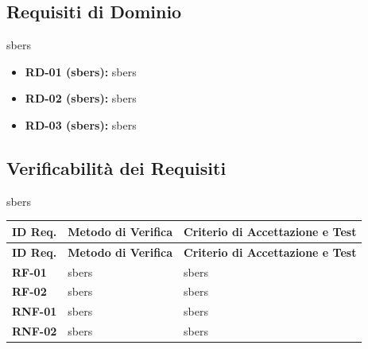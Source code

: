 \subsection{Requisiti di Dominio}

sbers

\begin{itemize}
    \item \textbf{RD-01 (sbers):} sbers
    \item \textbf{RD-02 (sbers):} sbers
    \item \textbf{RD-03 (sbers):} sbers
\end{itemize}

\subsection{Verificabilità dei Requisiti}

sbers

\begin{center}
\renewcommand{\arraystretch}{1.3}
\begin{longtable}{|p{2.5cm}|p{5.5cm}|p{7.5cm}|}
\hline
\rowcolor{tableheader} \textbf{ID Req.} & \textbf{Metodo di Verifica} & \textbf{Criterio di Accettazione e Test} \\ \hline
\endfirsthead

\hline
\rowcolor{tableheader} \textbf{ID Req.} & \textbf{Metodo di Verifica} & \textbf{Criterio di Accettazione e Test} \\ \hline
\endhead

\textbf{RF-01} & sbers & sbers \\ \hline
\textbf{RF-02} & sbers & sbers \\ \hline
\textbf{RNF-01} & sbers & sbers \\ \hline
\textbf{RNF-02} & sbers & sbers \\ \hline
\end{longtable}
\end{center}
